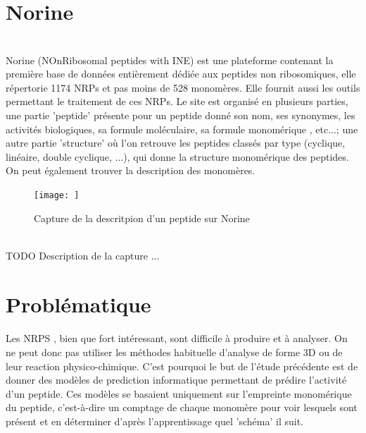 \documentclass[a4paper,10pt]{report}
\begin{document}
	
	  
      \section{Norine}
	
	\paragraph{}
	  
	  \\Norine (NOnRibosomal peptides with INE) est une plateforme contenant la première base de données entièrement dédiée aux peptides non ribosomiques, elle répertorie 1174 NRPs et pas moins de 528 monomères. Elle fournit aussi les outils permettant le traitement de ces NRPs. 
	  Le site est organisé en plusieurs parties, une partie 'peptide' présente pour un peptide donné son nom, ses synonymes, les activités biologiques, sa formule moléculaire, sa formule monomérique , etc...; une autre partie 'structure' où l'on retrouve les peptides classés par type (cyclique, linéaire, double cyclique, ...), qui donne la structure monomérique des peptides.
	  On peut également trouver la description des monomères. 
	   
	\begin{figure}[h]
	  \caption{Capture de la descritpion d'un peptide sur Norine}
	  \texttt{[image: ]}
	\end{figure}
	\\ TODO Description de la capture ... 
    
	
      \section{Problématique}
	
	\paragraph{}
	  Les NRPS , bien que fort intéressant, sont difficile à produire et à analyser. On ne peut donc pas utiliser les méthodes habituelle d'analyse de forme 3D ou de leur reaction physico-chimique.
	  C'est pourquoi le but de l'étude précédente est de donner des modèles de prediction informatique permettant de prédire l'activité d'un peptide.
	  Ces modèles se basaient uniquement sur l'empreinte monomérique du peptide, c'est-à-dire un comptage de chaque monomère pour voir lesquels sont présent et en déterminer d'après l'apprentissage quel 'schéma' il suit.
\end{document}
